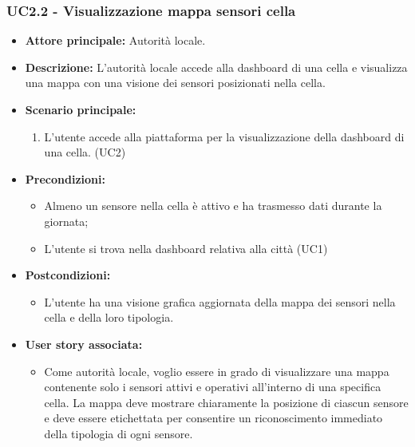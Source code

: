 \subsubsection{UC2.2 - Visualizzazione mappa sensori cella}
\begin{itemize}
    \item \textbf{Attore principale:} Autorità locale.
    \item \textbf{Descrizione:} L'autorità locale accede alla dashboard di una cella e visualizza una mappa con una visione dei sensori posizionati nella cella.
    \item \textbf{Scenario principale:}
    \begin{enumerate}
      \item L'utente accede alla piattaforma per la visualizzazione della dashboard di una cella. (UC2)
    \end{enumerate}
\item \textbf{Precondizioni:}
    \begin{itemize}
        \item  Almeno un sensore nella cella è attivo e ha trasmesso dati durante la giornata;
        \item L'utente si trova nella dashboard relativa alla città (UC1)
    \end{itemize}
    \item \textbf{Postcondizioni:}
          \begin{itemize}
              \item      L'utente ha una visione grafica aggiornata della mappa dei sensori nella cella e della loro tipologia.
          \end{itemize}
    \item \textbf{User story associata:}
          \begin{itemize}
              \item Come autorità locale, voglio essere in grado di visualizzare una mappa contenente solo i sensori attivi e operativi all'interno di una specifica cella. La mappa deve mostrare chiaramente la posizione di ciascun sensore e deve essere etichettata per consentire un riconoscimento immediato della tipologia di ogni sensore.
          \end{itemize}
\end{itemize}